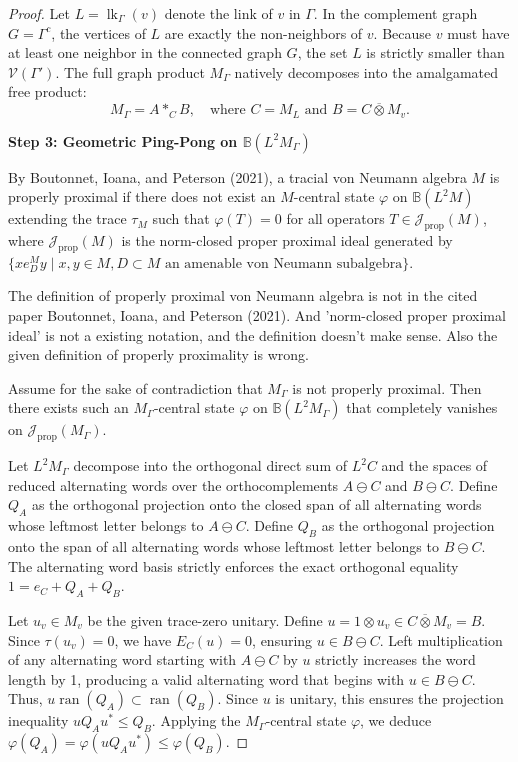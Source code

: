 \documentclass[12pt]{article}
\newcommand{\VV}{\mathcal{V}}
\newcommand{\review}[1]{\begin{reviewbox}#1\end{reviewbox}}
\begin{document}
\begin{proof}
Let $L = \operatorname{lk}_\Gamma(v)$ denote the link of $v$ in $\Gamma$. In the complement graph $G = \Gamma^c$, the vertices of $L$ are exactly the non-neighbors of $v$. Because $v$ must have at least one neighbor in the connected graph $G$, the set $L$ is strictly smaller than $\VV(\Gamma')$.
The full graph product $M_\Gamma$ natively decomposes into the amalgamated free product:
\[
M_\Gamma = A \ast_C B, \quad \text{where } C = M_L \text{ and } B = C \overline{\otimes} M_v.
\]

\medskip\noindent\textbf{Step 3: Geometric Ping-Pong on $\mathbb{B}(L^2M_\Gamma)$}

By Boutonnet, Ioana, and Peterson (2021), a tracial von Neumann algebra $M$ is properly proximal if there does not exist an $M$-central state $\varphi$ on $\mathbb{B}(L^2M)$ extending the trace $\tau_M$ such that $\varphi(T) = 0$ for all operators $T \in \mathcal{J}_{\mathrm{prop}}(M)$, where $\mathcal{J}_{\mathrm{prop}}(M)$ is the norm-closed proper proximal ideal generated by $\{x e_D^M y \mid x, y \in M, D \subset M \text{ an amenable von Neumann subalgebra}\}$.

\review{The definition of properly proximal von Neumann algebra is not in the cited paper Boutonnet, Ioana, and Peterson (2021). And 'norm-closed proper proximal ideal' is not a existing notation, and the definition doesn't make sense. Also the given definition of properly proximality is wrong.}

Assume for the sake of contradiction that $M_\Gamma$ is not properly proximal. Then there exists such an $M_\Gamma$-central state $\varphi$ on $\mathbb{B}(L^2M_\Gamma)$ that completely vanishes on $\mathcal{J}_{\mathrm{prop}}(M_\Gamma)$.


Let $L^2M_\Gamma$ decompose into the orthogonal direct sum of $L^2C$ and the spaces of reduced alternating words over the orthocomplements $A \ominus C$ and $B \ominus C$. Define $Q_A$ as the orthogonal projection onto the closed span of all alternating words whose leftmost letter belongs to $A \ominus C$. Define $Q_B$ as the orthogonal projection onto the span of all alternating words whose leftmost letter belongs to $B \ominus C$. The alternating word basis strictly enforces the exact orthogonal equality $1 = e_C + Q_A + Q_B$.

Let $u_v \in M_v$ be the given trace-zero unitary. Define $u = 1 \otimes u_v \in C \overline{\otimes} M_v = B$. Since $\tau(u_v)=0$, we have $E_C(u)=0$, ensuring $u \in B \ominus C$. Left multiplication of any alternating word starting with $A \ominus C$ by $u$ strictly increases the word length by 1, producing a valid alternating word that begins with $u \in B \ominus C$. Thus, $u \operatorname{ran}(Q_A) \subset \operatorname{ran}(Q_B)$. Since $u$ is unitary, this ensures the projection inequality $u Q_A u^* \le Q_B$. Applying the $M_\Gamma$-central state $\varphi$, we deduce $\varphi(Q_A) = \varphi(u Q_A u^*) \le \varphi(Q_B)$.


\end{proof}
\end{document}

